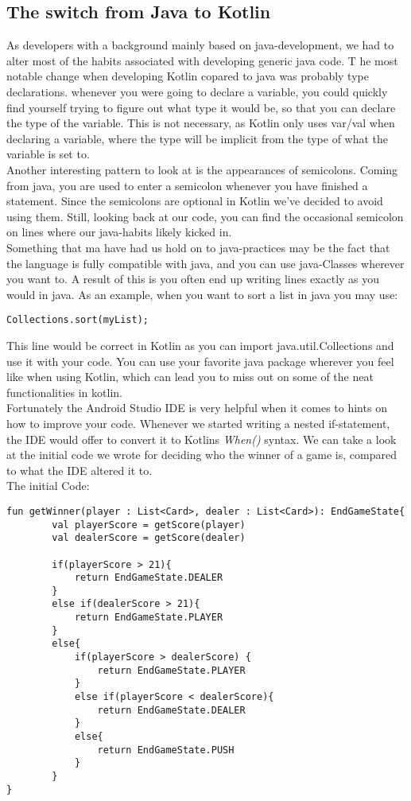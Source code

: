 \subsection{The switch from Java to Kotlin}
As developers with a background mainly based on java-development, we had to alter most of the habits associated with developing generic java code. T	he most notable change when developing Kotlin copared to java was probably type declarations. whenever you were going to declare a variable, you could quickly find yourself trying to figure out what type it would be, so that you can declare the type of the variable. This is not necessary, as Kotlin only uses var/val when declaring a variable, where the type will be implicit from the type of what the variable is set to.\\
Another interesting pattern to look at is the appearances of semicolons. Coming from java, you are used to enter a semicolon whenever you have finished a statement. Since the semicolons are optional in Kotlin we've decided to avoid using them. Still, looking back at our code, you can find the occasional semicolon on lines where our java-habits likely kicked in.\\
Something that ma have had us hold on to java-practices may be the fact that the language is fully compatible with java, and you can use java-Classes wherever you want to. A result of this is you often end up writing lines exactly as you would in java. As an example, when you want to sort a list in java you may use:
\begin{lstlisting} 
Collections.sort(myList);
\end{lstlisting}
This line would be correct in Kotlin as you can import java.util.Collections and use it with your code. You can use your favorite java package wherever you feel like when using Kotlin, which can lead you to miss out on some of the neat functionalities in kotlin.\\
Fortunately the Android Studio IDE is very helpful when it comes to hints on how to improve your code. Whenever we started writing a nested if-statement, the IDE would offer to convert it to Kotlins {\it When()} syntax. We can take a look at the initial code we wrote for deciding who the winner of a game is, compared to what the IDE altered it to.\\
The initial Code:
\begin{lstlisting}
fun getWinner(player : List<Card>, dealer : List<Card>): EndGameState{
        val playerScore = getScore(player)
        val dealerScore = getScore(dealer)

        if(playerScore > 21){
            return EndGameState.DEALER
        }
        else if(dealerScore > 21){
            return EndGameState.PLAYER
        }
        else{
            if(playerScore > dealerScore) {
                return EndGameState.PLAYER
            }
            else if(playerScore < dealerScore){
                return EndGameState.DEALER
            }
            else{
                return EndGameState.PUSH
            }
        }
} 
\end{lstlisting}
